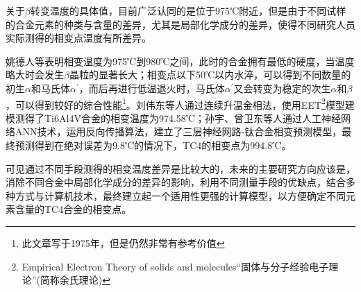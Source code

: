 \documentclass[
class = book,
zihao = -4,
font = noto,
paper = a4paper,
openany
]{easybook}
\newcommand{\ti}{Ti6Al4V}
\begin{document}
关于$\beta$转变温度的具体值，目前广泛认同的是位于975℃附近，但是由于不同试样的合金元素的种类与含量的差异，尤其是局部化学成分的差异，使得不同研究人员实际测得的相变点温度有所差异\cite{wangtaoTC4hejinxiangbianwendujiancezhongjieguobuyizhiyuanyinfenxi2013}。

姚德人等\cite{yaoderenTc4taihejinxiangbiandiandeceding1975}表明相变温度为975℃到980℃之间，此时的合金拥有最低的硬度，当温度略大时会发生$\beta$晶粒的显著长大；相变点以下50℃以内水淬，可以得到不同数量的初生$ \alpha $和马氏体$ \alpha^{\prime} $，而后再进行低温退火时，马氏体$ \alpha^{\prime} $又会转变为稳定的次生$ \alpha$和$ \beta $，可以得到较好的综合性能\footnote{\color{red}此文章写于1975年，但是仍然非常有参考价值}。刘伟东等人\cite{liuweidongTC4hejinVzhuanbianwendudejinxiangfacedingyulilunjisuan2014}通过连续升温金相法，使用EET\footnote{Empirical Electron Theory of solids and molecules“固体与分子经验电子理论”(简称余氏理论)}模型建模测得了\ti 合金的相变温度为974.58℃；孙宇、曾卫东等人\cite{sunyuYingyongrengongshenjingwangluoyanjiuhuaxueyuansuduitaihejinxiangbiandiandeyingxiang2010}通过人工神经网络ANN技术，运用反向传播算法，建立了三层神经网路-钛合金相变预测模型，最终预测得到在绝对误差为9.8℃的情况下，TC4的相变点为994.8℃。

可见通过不同手段测得的相变温度差异是比较大的，未来的主要研究方向应该是，消除不同合金中局部化学成分的差异的影响，利用不同测量手段的优缺点，结合多种方式与计算机技术，最终建立起一个适用性更强的计算模型，以方便确定不同元素含量的TC4合金的相变点。
\end{document}

